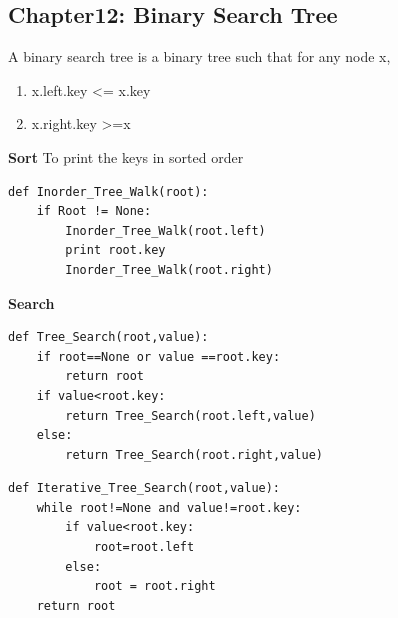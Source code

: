 \documentclass[11pt]{article}
\begin{document}
\subsection{Chapter12: Binary Search Tree}
\label{sec:org7024021}
A binary search tree is a binary tree such that for any node x, 
\begin{enumerate}
\item x.left.key <= x.key
\item x.right.key >=x
\end{enumerate}

\textbf{Sort} To print the keys in sorted order
\begin{verbatim}
def Inorder_Tree_Walk(root):
    if Root != None:
        Inorder_Tree_Walk(root.left)
        print root.key
        Inorder_Tree_Walk(root.right)
\end{verbatim}

\textbf{Search}
\begin{verbatim}
def Tree_Search(root,value):
    if root==None or value ==root.key:
        return root
    if value<root.key:
        return Tree_Search(root.left,value)
    else:
        return Tree_Search(root.right,value)
\end{verbatim}

\begin{verbatim}
def Iterative_Tree_Search(root,value):
    while root!=None and value!=root.key:
        if value<root.key:
            root=root.left
        else:
            root = root.right
    return root
\end{verbatim}
\end{document}
